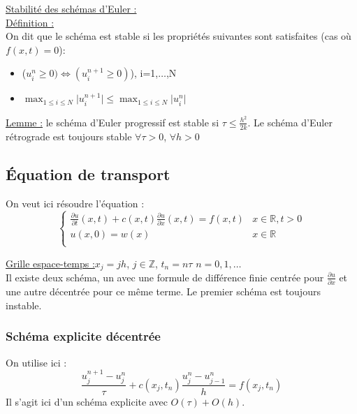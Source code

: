 \documentclass[../main.tex]{subfiles}
\begin{document}
\quad \underline{Stabilité des schémas d'Euler :}\\
\underline{Définition :}\\
On dit que le schéma est stable si les propriétés suivantes sont satisfaites (cas où $f(x,t)=0$): \begin{itemize}
    \item ($u_i^n\geq 0) \Leftrightarrow(u_i^{n+1}\geq 0)$), i=1,$\dots$,N\\
    \item $\max_{1\leq i \leq N} \lvert u_i^{n+1}\rvert \leq \max_{1\leq i \leq N}\lvert u_i^n\rvert$\\
\end{itemize}


\quad \underline{Lemme :} le schéma d'Euler progressif est stable si $\tau \leq  \frac{h^2}{2k}$. Le schéma d'Euler rétrograde est toujours stable $\forall \tau >0$, $\forall h>0$\\


\subsection{Équation de transport}
On veut ici résoudre l'équation : \begin{equation}
    \begin{cases}
        \frac{\partial u}{\partial t}(x,t) + c(x,t) \frac{\partial u}{\partial x}(x,t) = f(x,t) & x\in \mathbb{R}, t>0\\
        u(x,0) = w(x) & x \in \mathbb{R}\\
    \end{cases}
\end{equation}

\quad \underline{Grille espace-temps :}$x_j = jh$, $j\in \mathbb{Z}$, $t_n = n\tau$ $n=0,1, \dots$\\
Il existe deux schéma, un avec une formule de différence finie centrée pour $ \frac{\partial u}{\partial x}$ et une autre décentrée pour ce même terme. Le premier schéma est toujours instable.\\


\subsubsection{Schéma explicite décentrée}
On utilise ici : \begin{equation}
    \frac{u_j^{n+1}-u_j^n}{\tau}+ c(x_j,t_n) \frac{u_j^n-u_{j-1}^n}{h} = f(x_j,t_n)
\end{equation}
Il s'agit ici d'un schéma explicite avec $O(\tau) + O(h)$.\\
\end{document}
